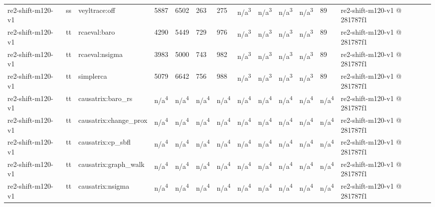 \begin{table}[t]
\begin{tabular}{lllllllllllll}
re2-shift-m120-v1 & ss & veyltrace:off & 5887 & 6502 & 263 & 275 & n/a\textsuperscript{3} & n/a\textsuperscript{3} & n/a\textsuperscript{3} & n/a\textsuperscript{3} & 89 & re2-shift-m120-v1 @ 281787f1 \\
re2-shift-m120-v1 & tt & rcaeval:baro & 4290 & 5449 & 729 & 976 & n/a\textsuperscript{3} & n/a\textsuperscript{3} & n/a\textsuperscript{3} & n/a\textsuperscript{3} & 89 & re2-shift-m120-v1 @ 281787f1 \\
re2-shift-m120-v1 & tt & rcaeval:nsigma & 3983 & 5000 & 743 & 982 & n/a\textsuperscript{3} & n/a\textsuperscript{3} & n/a\textsuperscript{3} & n/a\textsuperscript{3} & 89 & re2-shift-m120-v1 @ 281787f1 \\
re2-shift-m120-v1 & tt & simplerca & 5079 & 6642 & 756 & 988 & n/a\textsuperscript{3} & n/a\textsuperscript{3} & n/a\textsuperscript{3} & n/a\textsuperscript{3} & 89 & re2-shift-m120-v1 @ 281787f1 \\
re2-shift-m120-v1 & tt & causatrix:baro\_rs & n/a\textsuperscript{4} & n/a\textsuperscript{4} & n/a\textsuperscript{4} & n/a\textsuperscript{4} & n/a\textsuperscript{4} & n/a\textsuperscript{4} & n/a\textsuperscript{4} & n/a\textsuperscript{4} & n/a\textsuperscript{4} & re2-shift-m120-v1 @ 281787f1 \\
re2-shift-m120-v1 & tt & causatrix:change\_prox & n/a\textsuperscript{4} & n/a\textsuperscript{4} & n/a\textsuperscript{4} & n/a\textsuperscript{4} & n/a\textsuperscript{4} & n/a\textsuperscript{4} & n/a\textsuperscript{4} & n/a\textsuperscript{4} & n/a\textsuperscript{4} & re2-shift-m120-v1 @ 281787f1 \\
re2-shift-m120-v1 & tt & causatrix:cp\_sbfl & n/a\textsuperscript{4} & n/a\textsuperscript{4} & n/a\textsuperscript{4} & n/a\textsuperscript{4} & n/a\textsuperscript{4} & n/a\textsuperscript{4} & n/a\textsuperscript{4} & n/a\textsuperscript{4} & n/a\textsuperscript{4} & re2-shift-m120-v1 @ 281787f1 \\
re2-shift-m120-v1 & tt & causatrix:graph\_walk & n/a\textsuperscript{4} & n/a\textsuperscript{4} & n/a\textsuperscript{4} & n/a\textsuperscript{4} & n/a\textsuperscript{4} & n/a\textsuperscript{4} & n/a\textsuperscript{4} & n/a\textsuperscript{4} & n/a\textsuperscript{4} & re2-shift-m120-v1 @ 281787f1 \\
re2-shift-m120-v1 & tt & causatrix:nsigma & n/a\textsuperscript{4} & n/a\textsuperscript{4} & n/a\textsuperscript{4} & n/a\textsuperscript{4} & n/a\textsuperscript{4} & n/a\textsuperscript{4} & n/a\textsuperscript{4} & n/a\textsuperscript{4} & n/a\textsuperscript{4} & re2-shift-m120-v1 @ 281787f1 \\

\end{tabular}
\end{table}
